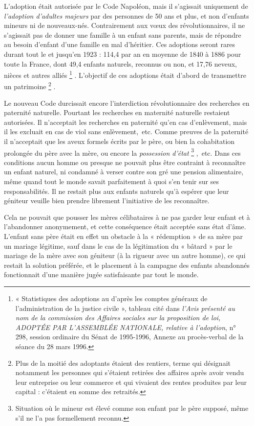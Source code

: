  L'adoption était autorisée par le Code Napoléon, mais il s'agissait uniquement de \emph{l'adoption d'adultes majeurs} par des personnes de 50 ans et plus, et non d'enfants mineurs ni de nouveaux-nés. Contrairement aux vœux des révolutionnaires, il ne s'agissait pas de donner une famille à un enfant sans parents, mais de répondre au besoin d'enfant d'une famille en mal d'héritier. Ces adoptions seront rares durant tout le  et jusqu'en 1923 : 114,4 par an en moyenne de 1840 à 1886 pour toute la France, dont 49,4 enfants naturels, reconnus ou non, et 17,76 neveux, nièces et autres alliés%
\footnote{« Statistiques des adoptions au  d'après les comptes généraux de l'administration de la justice civile », tableau cité dans \emph{l'Avis présenté au nom de la commission des Affaires sociales sur la proposition de loi, ADOPTÉE PAR L'ASSEMBLÉE NATIONALE, relative à l'adoption}, n° 298, session ordinaire du Sénat de 1995-1996, Annexe au procès-verbal de la séance du 28 mars 1996.}%
. L'objectif de ces adoptions était d'abord de transmettre un patrimoine%
\footnote{Plus de la moitié des adoptants étaient des rentiers, terme qui désignait notamment les personnes qui s'étaient retirées des affaires après avoir vendu leur entreprise ou leur commerce et qui vivaient des rentes produites par leur capital : c'étaient en somme des retraités.}%
. 

 Le nouveau Code durcissait encore l'interdiction révolutionnaire des recherches en paternité naturelle. Pourtant les recherches en maternité naturelle restaient autorisées. Il n'acceptait les recherches en paternité qu'en cas d'enlèvement, mais il les excluait en cas de viol sans enlèvement,~etc. Comme preuves de la paternité il n'acceptait que les aveux formels écrits par le père, ou bien la cohabitation prolongée du père avec la mère, ou encore la \emph{possession d'état}%
\footnote{Situation où le mineur est élevé comme son enfant par le père supposé, même s'il ne l'a pas formellement reconnu.}%
,~etc. Dans ces conditions aucun homme ou presque ne pouvait plus être contraint à reconnaître un enfant naturel, ni condamné à verser contre son gré une pension alimentaire, même quand tout le monde savait parfaitement à quoi s'en tenir sur ses responsabilités. Il ne restait plus aux enfants naturels qu'à espérer que leur géniteur veuille bien prendre librement l'initiative de les reconnaître. 

 Cela ne pouvait que pousser les mères célibataires à ne pas garder leur enfant et à l'abandonner anonymement, et cette conséquence était acceptée sans état d'âme. L'enfant sans père était en effet un obstacle à la « rédemption » de sa mère par un mariage légitime, sauf dans le cas de la légitimation du « bâtard » par le mariage de la mère avec son géniteur (à la rigueur avec un autre homme), ce qui restait la solution préférée, et le placement à la campagne des enfants abandonnés fonctionnait d'une manière jugée satisfaisante par tout le monde. 


